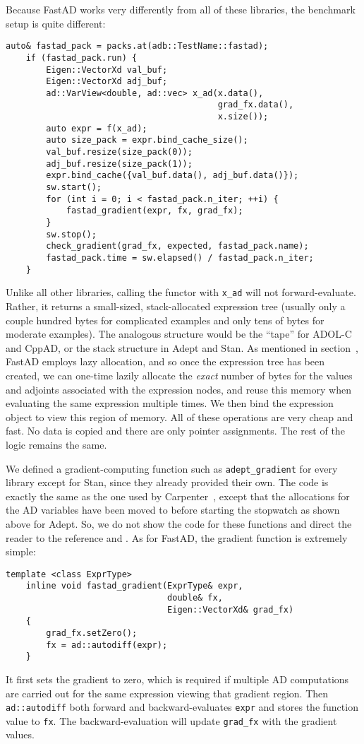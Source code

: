 Because FastAD works very differently from all of these libraries,
the benchmark setup is quite different:
\begin{lstlisting}[style=customcpp]
    auto& fastad_pack = packs.at(adb::TestName::fastad);
    if (fastad_pack.run) {
        Eigen::VectorXd val_buf;
        Eigen::VectorXd adj_buf;
        ad::VarView<double, ad::vec> x_ad(x.data(),
                                          grad_fx.data(),
                                          x.size());
        auto expr = f(x_ad);
        auto size_pack = expr.bind_cache_size();
        val_buf.resize(size_pack(0));
        adj_buf.resize(size_pack(1));
        expr.bind_cache({val_buf.data(), adj_buf.data()});
        sw.start();
        for (int i = 0; i < fastad_pack.n_iter; ++i) {
            fastad_gradient(expr, fx, grad_fx);
        }
        sw.stop();
        check_gradient(grad_fx, expected, fastad_pack.name);
        fastad_pack.time = sw.elapsed() / fastad_pack.n_iter;
    }
\end{lstlisting}
Unlike all other libraries, calling the functor with \verb|x_ad| will not forward-evaluate.
Rather, it returns a small-sized, stack-allocated expression tree 
(usually only a couple hundred bytes for complicated examples and only tens of bytes for moderate examples).
The analogous structure would be the ``tape'' for ADOL-C and CppAD,
or the stack structure in Adept and Stan.
As mentioned in section~,
FastAD employs lazy allocation, and so once the expression tree has been created,
we can one-time lazily allocate the \emph{exact} number of bytes for the values and adjoints
associated with the expression nodes, and reuse this memory when evaluating the same expression multiple times.
We then bind the expression object to view this region of memory.
All of these operations are very cheap and fast.
No data is copied and there are only pointer assignments.
The rest of the logic remains the same.

We defined a gradient-computing function such as \verb|adept_gradient| for every library except for Stan,
since they already provided their own.
The code is exactly the same as the one used by Carpenter~\cite{carpenter:2015},
except that the allocations for the AD variables have been moved to before starting the stopwatch as shown above for Adept.
So, we do not show the code for these functions and 
direct the reader to the reference and .
As for FastAD, the gradient function is extremely simple:
\begin{lstlisting}[style=customcpp]
    template <class ExprType>
    inline void fastad_gradient(ExprType& expr,
                                double& fx,
                                Eigen::VectorXd& grad_fx) 
    {
        grad_fx.setZero();
        fx = ad::autodiff(expr);
    }
\end{lstlisting}
It first sets the gradient to zero, which is required if multiple AD computations 
are carried out for the same expression viewing that gradient region.
Then \verb|ad::autodiff| both forward and backward-evaluates \verb|expr|
and stores the function value to \verb|fx|.
The backward-evaluation will update \verb|grad_fx| with the gradient values.

